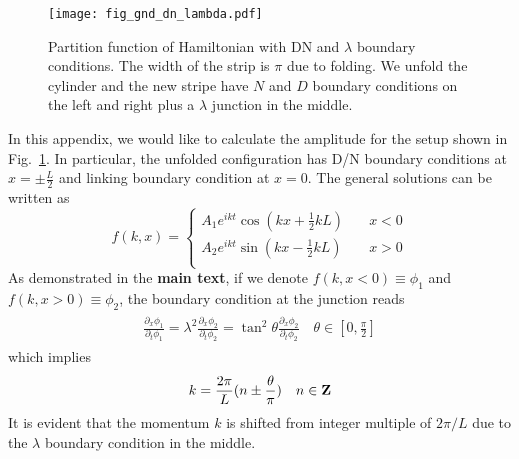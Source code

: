 
\begin{figure}[h]
\centering
\texttt{[image: fig\_gnd\_dn\_lambda.pdf]}
\caption{Partition function of Hamiltonian with DN and $\lambda$ boundary conditions. The width of the strip is $\pi$ due to folding. We unfold the cylinder and the new stripe have $N$ and $D$ boundary conditions on the left and right plus a $\lambda$ junction in the middle. }
\label{Fig in gnd_dn_lambda}
\end{figure}

In this appendix, we would like to calculate the amplitude for the setup shown in Fig.~\ref{Fig in gnd_dn_lambda}. In particular, the unfolded configuration has D/N boundary conditions at $x = \pm \frac{L}{2}$ and linking boundary condition at $x = 0$. The general solutions can be written as
\begin{equation}
\label{Normalized f in gnd_dn_lambda}
f(k, x) = 
\left\lbrace
\begin{aligned}
  A_1 e^{i kt} \cos(kx +\frac{1}{2}kL ) &  \quad x < 0  \\
  A_2 e^{ikt}  \sin(kx - \frac{1}{2}kL ) & \quad x > 0   \\
\end{aligned} \right. 
\end{equation}
As demonstrated in the {\bf\color{red}main text}, if we denote $f(k,x<0)\equiv\phi_1$ and $f(k,x>0)\equiv\phi_2$, the boundary condition at the junction reads
\begin{eqnarray}\begin{aligned}
\frac{\partial_x \phi_1}{ \partial_t \phi_1} = \lambda^2 \frac{\partial_x \phi_2}{ \partial_t \phi_2} = \tan^2 \theta\frac{\partial_x \phi_2}{ \partial_t \phi_2} \quad \theta \in [0,\frac{\pi}{2} ]  
\end{aligned}\end{eqnarray}
which implies
\begin{equation}
\label{Momentum in gnd_dn_lambda}
k = \frac{2\pi}{L}( n \pm \frac{\theta}{\pi} )  \quad n\in{\bf Z}
\end{equation}
It is evident that the momentum $k$ is shifted from integer multiple of $2\pi/L$ due to the $\lambda$ boundary condition in the middle. 
